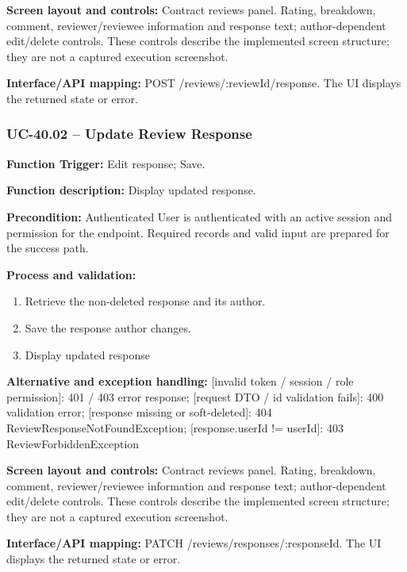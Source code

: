 \textbf{Screen layout and controls:} Contract reviews panel. Rating, breakdown, comment, reviewer/\allowbreak{}reviewee information and response text; author-dependent edit/\allowbreak{}delete controls. These controls describe the implemented screen structure; they are not a captured execution screenshot.

\textbf{Interface/\allowbreak{}API mapping:} POST /\allowbreak{}reviews/\allowbreak{}:review\allowbreak{}Id/\allowbreak{}response. The UI displays the returned state or error.

\subsubsection{UC-40.02 -- Update Review Response}
\textbf{Function Trigger:} Edit response; Save.

\textbf{Function description:} Display updated response.

\textbf{Precondition:} Authenticated User is authenticated with an active session and permission for the endpoint. Required records and valid input are prepared for the success path.

\textbf{Process and validation:}
\begin{enumerate}
\item Retrieve the non-deleted response and its author.
\item Save the response author changes.
\item Display updated response
\end{enumerate}
\textbf{Alternative and exception handling:} [invalid token /\allowbreak{} session /\allowbreak{} role permission]: 401 /\allowbreak{} 403 error response; [request DTO /\allowbreak{} id validation fails]: 400 validation error; [response missing or soft-deleted]: 404 Review\allowbreak{}Response\allowbreak{}Not\allowbreak{}Found\allowbreak{}Exception; [response.user\allowbreak{}Id !=\allowbreak{} user\allowbreak{}Id]: 403 Review\allowbreak{}Forbidden\allowbreak{}Exception

\textbf{Screen layout and controls:} Contract reviews panel. Rating, breakdown, comment, reviewer/\allowbreak{}reviewee information and response text; author-dependent edit/\allowbreak{}delete controls. These controls describe the implemented screen structure; they are not a captured execution screenshot.

\textbf{Interface/\allowbreak{}API mapping:} PATCH /\allowbreak{}reviews/\allowbreak{}responses/\allowbreak{}:response\allowbreak{}Id. The UI displays the returned state or error.

